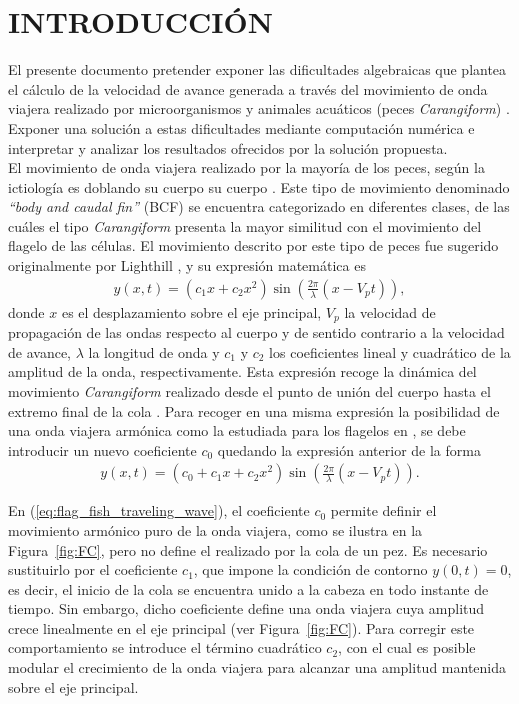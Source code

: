 \section{INTRODUCCIÓN} \label{sec:Introduccion}
El presente documento pretender exponer las dificultades algebraicas que plantea el cálculo de la velocidad de avance generada a través del movimiento de onda viajera realizado por microorganismos \cite{Gray1955} y animales acuáticos (peces \textit{Carangiform}) \cite{Korkmaz2012,Korkmaz2011}. Exponer una solución a estas dificultades mediante computación numérica e interpretar y analizar los resultados ofrecidos por la solución propuesta.\\

El movimiento de onda viajera realizado por la mayoría de los peces, según la ictiología es doblando su cuerpo su cuerpo \cite{modeswim}. Este tipo de movimiento denominado \textit{``body and caudal fin''} (BCF) se encuentra categorizado en diferentes clases, de las cuáles el tipo \textit{Carangiform}  presenta la mayor similitud con el movimiento del flagelo de las células. El movimiento descrito por este tipo de peces fue sugerido originalmente por Lighthill \cite{FLM:368244}, y su expresión matemática es
\begin{eqnarray}
	\label{eq:fish_traveling_wave}
	y (x,t) = (c_1 x + c_2 x^2) \sin \left( \frac{2 \pi}{\lambda}  ( x - V_p t) \right),
\end{eqnarray}
donde $x$ es el desplazamiento sobre el eje principal, $V_p$ la velocidad de propagación de las ondas respecto al cuerpo y de sentido contrario a la velocidad de avance, $\lambda$ la longitud de onda y $c_1$ y $c_2$ los coeficientes lineal y cuadrático de la amplitud de la onda, respectivamente. Esta expresión recoge la dinámica del movimiento \textit{Carangiform} realizado desde el punto de unión del cuerpo hasta el extremo final de la cola \cite{Robotic_Fish,Robotic_Fish_speed,Robotic_Fish_3D}. Para recoger en una misma expresión la posibilidad de una onda viajera arm\'onica como la estudiada para los flagelos en \cite{gray1955propulsion}, se debe introducir un nuevo coeficiente $c_0$ quedando la expresión anterior de la forma
\begin{eqnarray}
	\label{eq:flag_fish_traveling_wave}
	y (x,t) = (c_0+c_1 x + c_2 x^2) \sin \left( \frac{2 \pi}{\lambda}  ( x - V_p t) \right).
\end{eqnarray}

En (\ref{eq:flag_fish_traveling_wave}), el coeficiente $c_0$ permite definir el movimiento armónico puro de la onda viajera, como se ilustra en la Figura~\ref{fig:FC}, pero no define el realizado por la cola de un pez. Es necesario sustituirlo por el coeficiente $c_1$, que impone la condición de contorno $y(0,t) = 0$, es decir, el inicio de la cola se encuentra unido a la cabeza en todo instante de tiempo. Sin embargo, dicho coeficiente define una onda viajera cuya amplitud crece linealmente en el eje principal (ver Figura~\ref{fig:FC}). Para corregir este comportamiento se introduce el término cuadrático $c_2$, con el cual es posible modular el crecimiento de la onda viajera para alcanzar una amplitud mantenida sobre el eje principal.

